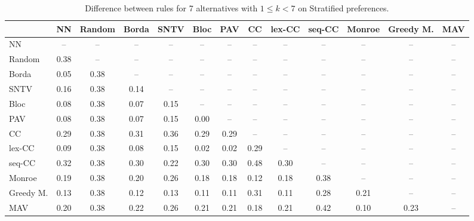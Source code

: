 
\begin{table*}[h!]
\centering
\begin{tabular}{lcccccccccccc}
\toprule
 & NN & Random & Borda & SNTV & Bloc & PAV & CC & lex-CC & seq-CC & Monroe & Greedy M. & MAV \\
\midrule
NN & -- & -- & -- & -- & -- & -- & -- & -- & -- & -- & -- & -- \\
Random & 0.38 & -- & -- & -- & -- & -- & -- & -- & -- & -- & -- & -- \\
Borda & 0.05 & 0.38 & -- & -- & -- & -- & -- & -- & -- & -- & -- & -- \\
SNTV & 0.16 & 0.38 & 0.14 & -- & -- & -- & -- & -- & -- & -- & -- & -- \\
Bloc & 0.08 & 0.38 & 0.07 & 0.15 & -- & -- & -- & -- & -- & -- & -- & -- \\
PAV & 0.08 & 0.38 & 0.07 & 0.15 & 0.00 & -- & -- & -- & -- & -- & -- & -- \\
CC & 0.29 & 0.38 & 0.31 & 0.36 & 0.29 & 0.29 & -- & -- & -- & -- & -- & -- \\
lex-CC & 0.09 & 0.38 & 0.08 & 0.15 & 0.02 & 0.02 & 0.29 & -- & -- & -- & -- & -- \\
seq-CC & 0.32 & 0.38 & 0.30 & 0.22 & 0.30 & 0.30 & 0.48 & 0.30 & -- & -- & -- & -- \\
Monroe & 0.19 & 0.38 & 0.20 & 0.26 & 0.18 & 0.18 & 0.12 & 0.18 & 0.38 & -- & -- & -- \\
Greedy M. & 0.13 & 0.38 & 0.12 & 0.13 & 0.11 & 0.11 & 0.31 & 0.11 & 0.28 & 0.21 & -- & -- \\
MAV & 0.20 & 0.38 & 0.22 & 0.26 & 0.21 & 0.21 & 0.18 & 0.21 & 0.42 & 0.10 & 0.23 & -- \\
\bottomrule
\end{tabular}

\caption{Difference between rules for 7 alternatives with $1 \leq k < 7$ on Stratified preferences.}
\end{table*}
